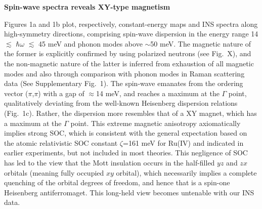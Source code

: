 \vspace{ 10 pt}
\noindent
{\bf Spin-wave spectra reveals XY-type magnetism}

\noindent
Figures 1a and 1b plot, respectively, constant-energy maps and INS spectra along high-symmetry directions, comprising spin-wave dispersion in the energy range 14 $\lesssim$ $\hbar\omega$ $\lesssim$ 45 meV and phonon modes above $\sim$50 meV. The magnetic nature of the former is explicitly confirmed by using polarized neutrons (see Fig.~X), and the non-magnetic nature of the latter is inferred from exhaustion of all magnetic modes and also through comparison with phonon modes in Raman scattering data (See Supplementary Fig.~1). The spin-wave emanates from the ordering vector ($\pi$,$\pi$) with a gap of $\approx$14 meV, and reaches a maximum at the $\Gamma$ point, qualitatively deviating from the well-known Heisenberg dispersion relations (Fig.~1c). Rather, the dispersion more resembles that of a XY magnet, which has a maximum at the $\Gamma$ point. This extreme magnetic anisotropy axiomatically implies strong SOC, which is consistent with the general expectation based on the atomic relativistic SOC constant $\zeta$=161 meV for Ru(IV) and indicated in earlier experiments\cite{Mizokawa_2001,Haverkort_2008,Fatuzzo_2015}, but not included in most theories\cite{Anisimov_2002,Hotta_2002,Liebsch_2007,Gorelov_2010}. This negligence of SOC has led to the view that the Mott insulation occurs in the half-filled $yz$ and $zx$ orbitals (meaning fully occupied $xy$ orbital), which necessarily implies a complete quenching of the orbital degrees of freedom, and hence that \CRO is a spin-one Heisenberg antiferromaget. This long-held view becomes untenable with our INS data.

  
  
  
  
  